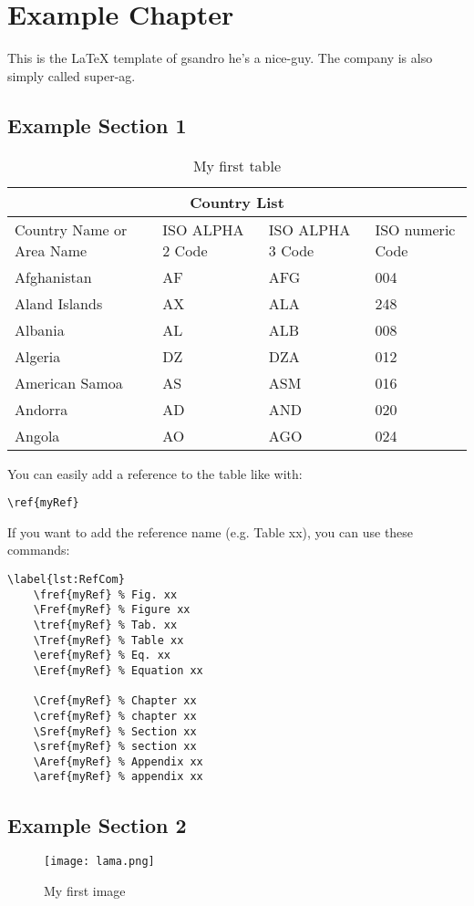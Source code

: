 \chapter{Example Chapter}
This is the \LaTeX{} template of gsandro he's a \ac{nice-guy}. The company is also simply called \ac{super-ag}.

\section{Example Section 1}

\begin{table}[ht]
	\begin{center}
		\caption{My first table}
		\begin{tabular}{ |p{3cm}||p{3cm}|p{3cm}|p{3cm}|  }
			\hline
			\multicolumn{4}{|c|}{Country List} \\
			\hline
			Country Name or Area Name & ISO ALPHA 2 Code & ISO ALPHA 3 Code & ISO numeric Code\\
			\hline
			Afghanistan & AF & AFG & 004\\
			Aland Islands & AX & ALA & 248\\
			Albania & AL & ALB & 008\\
			Algeria & DZ & DZA & 012\\
			American Samoa & AS & ASM & 016\\
			Andorra & AD & AND & 020\\
			Angola & AO & AGO & 024\\
			\hline
		\end{tabular}
		\label{tab:countries}
	\end{center}
\end{table}

You can easily add a reference to the table like  with:

\begin{lstlisting}[language=Tex]
	\ref{myRef}
\end{lstlisting}

If you want to add the reference name (e.g. Table xx), you can use these commands:

\begin{lstlisting}[language=Tex, caption=List of reference commands]
	\label{lst:RefCom}
	\fref{myRef} % Fig. xx
	\Fref{myRef} % Figure xx
	\tref{myRef} % Tab. xx
	\Tref{myRef} % Table xx
	\eref{myRef} % Eq. xx
	\Eref{myRef} % Equation xx
	
	\Cref{myRef} % Chapter xx
	\cref{myRef} % chapter xx
	\Sref{myRef} % Section xx
	\sref{myRef} % section xx
	\Aref{myRef} % Appendix xx
	\aref{myRef} % appendix xx
\end{lstlisting}


\section{Example Section 2}

\begin{figure}[ht]
	\begin{center}
		\texttt{[image: lama.png]}
		\caption{My first image}
		\label{fig:lama}
	\end{center}
\end{figure}




